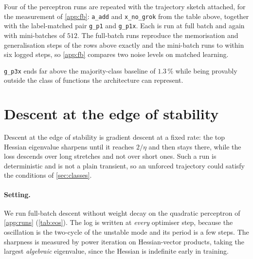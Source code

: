 \documentclass[twoside]{article}
\begin{document}
Four of the perceptron runs are repeated with the trajectory sketch attached, for the measurement
of \cref{app:fb}: \texttt{a\_add} and \texttt{x\_no\_grok} from the table above, together with the
label-matched pair \texttt{g\_p1} and \texttt{g\_p1x}. Each is run at full batch and again with
mini-batches of $512$. The full-batch runs reproduce the memorisation and generalisation steps of the rows above exactly and the mini-batch
runs to within six logged steps, so \cref{app:fb} compares two noise levels on matched learning.

\texttt{g\_p3x} ends far above the majority-class baseline of $1.3\,\%$ while
being provably outside the class of functions the architecture can represent.

\section{Descent at the edge of stability}\label{app:eos}

Descent at the edge of stability \citep{cohen2021gradient} is gradient descent at a fixed rate: the
top Hessian eigenvalue sharpens until it reaches $2/\eta$ and then stays there, while the loss
descends over long stretches and not over short ones. Such a run is deterministic and is not a plain transient, so an unforced trajectory could satisfy the conditions of \cref{sec:classes}.

\paragraph{Setting.} We run full-batch descent without weight decay on the quadratic perceptron of
\cref{app:runs} (\cref{tab:eos}). The log is written at \emph{every} optimiser step, because the oscillation is the two-cycle of the unstable
mode and its period is a few steps. The sharpness is measured by power iteration on Hessian-vector
products, taking the largest \emph{algebraic} eigenvalue, since the Hessian is indefinite early in
training.
\end{document}
